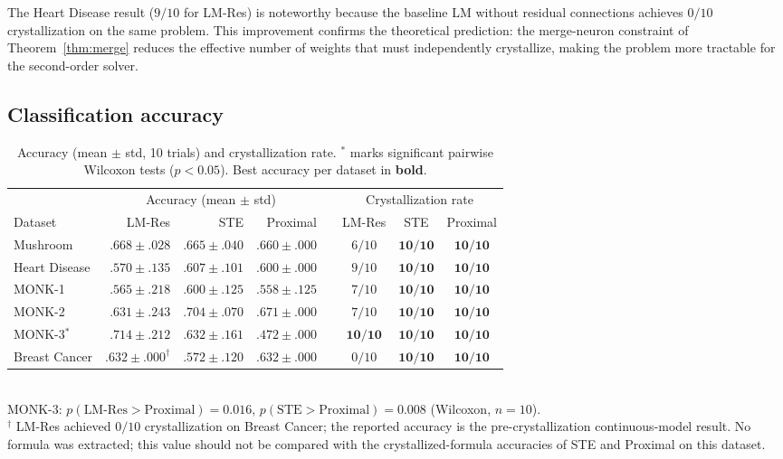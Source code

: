 \documentclass[10pt,a4paper,twoside]{article}
\begin{document}
The Heart Disease result ($9/10$ for LM-Res) is noteworthy because the
baseline LM without residual connections achieves $0/10$ crystallization on
the same problem.
This improvement confirms the theoretical prediction: the merge-neuron
constraint of Theorem~\ref{thm:merge} reduces the effective number of weights
that must independently crystallize, making the problem more tractable for
the second-order solver.

\subsection{Classification accuracy}
\label{ssec:accuracy}

\begin{table}[h]
\centering
\caption{Accuracy (mean $\pm$ std, 10 trials) and crystallization rate.
$^{\ast}$ marks significant pairwise Wilcoxon tests ($p < 0.05$).
Best accuracy per dataset in \textbf{bold}.}
\label{tab:acc}
\setlength{\tabcolsep}{4.5pt}
\begin{tabular}{l rrr c ccc}
\toprule
 & \multicolumn{3}{c}{Accuracy (mean $\pm$ std)} & &
   \multicolumn{3}{c}{Crystallization rate} \\
\cmidrule(lr){2-4}\cmidrule(lr){6-8}
Dataset & LM-Res & STE & Proximal & & LM-Res & STE & Proximal \\
\midrule
Mushroom
  & $\mathbf{.668 \pm .028}$
  & $.665 \pm .040$
  & $.660 \pm .000$
  &
  & $6/10$ & $\mathbf{10/10}$ & $\mathbf{10/10}$ \\
Heart Disease
  & $.570 \pm .135$
  & $\mathbf{.607 \pm .101}$
  & $.600 \pm .000$
  &
  & $9/10$ & $\mathbf{10/10}$ & $\mathbf{10/10}$ \\
MONK-1
  & $.565 \pm .218$
  & $\mathbf{.600 \pm .125}$
  & $.558 \pm .125$
  &
  & $7/10$ & $\mathbf{10/10}$ & $\mathbf{10/10}$ \\
MONK-2
  & $.631 \pm .243$
  & $\mathbf{.704 \pm .070}$
  & $.671 \pm .000$
  &
  & $7/10$ & $\mathbf{10/10}$ & $\mathbf{10/10}$ \\
MONK-3$^{\ast}$
  & $\mathbf{.714 \pm .212}$
  & $.632 \pm .161$
  & $.472 \pm .000$
  &
  & $\mathbf{10/10}$ & $\mathbf{10/10}$ & $\mathbf{10/10}$ \\
Breast Cancer
  & $\mathbf{.632 \pm .000}^{\dagger}$
  & $.572 \pm .120$
  & $\mathbf{.632 \pm .000}$
  &
  & $0/10$ & $\mathbf{10/10}$ & $\mathbf{10/10}$ \\
\bottomrule
\end{tabular}
\smallskip\\
{\footnotesize MONK-3: $p(\text{LM-Res} > \text{Proximal}) = 0.016$,
$p(\text{STE} > \text{Proximal}) = 0.008$ (Wilcoxon, $n = 10$).\\
$^{\dagger}$ LM-Res achieved $0/10$ crystallization on Breast Cancer;
the reported accuracy is the pre-crystallization continuous-model result.
No formula was extracted; this value should not be compared with the
crystallized-formula accuracies of STE and Proximal on this dataset.}
\end{table}
\end{document}
